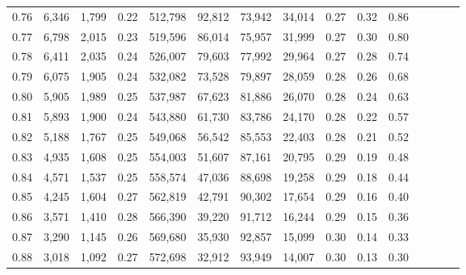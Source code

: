 \begin{tabular}{rrrcrrrrrrrrrrr}
0.76 &   6,346 &  1,799 &                                       0.22 &  512,798 &   92,812 &   73,942 &   34,014 &  0.27 &  0.32 &                         0.86 \\
0.77 &   6,798 &  2,015 &                                       0.23 &  519,596 &   86,014 &   75,957 &   31,999 &  0.27 &  0.30 &                         0.80 \\
0.78 &   6,411 &  2,035 &                                       0.24 &  526,007 &   79,603 &   77,992 &   29,964 &  0.27 &  0.28 &                         0.74 \\
0.79 &   6,075 &  1,905 &                                       0.24 &  532,082 &   73,528 &   79,897 &   28,059 &  0.28 &  0.26 &                         0.68 \\
0.80 &   5,905 &  1,989 &                                       0.25 &  537,987 &   67,623 &   81,886 &   26,070 &  0.28 &  0.24 &                         0.63 \\
0.81 &   5,893 &  1,900 &                                       0.24 &  543,880 &   61,730 &   83,786 &   24,170 &  0.28 &  0.22 &                         0.57 \\
0.82 &   5,188 &  1,767 &                                       0.25 &  549,068 &   56,542 &   85,553 &   22,403 &  0.28 &  0.21 &                         0.52 \\
0.83 &   4,935 &  1,608 &                                       0.25 &  554,003 &   51,607 &   87,161 &   20,795 &  0.29 &  0.19 &                         0.48 \\
0.84 &   4,571 &  1,537 &                                       0.25 &  558,574 &   47,036 &   88,698 &   19,258 &  0.29 &  0.18 &                         0.44 \\
0.85 &   4,245 &  1,604 &                                       0.27 &  562,819 &   42,791 &   90,302 &   17,654 &  0.29 &  0.16 &                         0.40 \\
0.86 &   3,571 &  1,410 &                                       0.28 &  566,390 &   39,220 &   91,712 &   16,244 &  0.29 &  0.15 &                         0.36 \\
0.87 &   3,290 &  1,145 &                                       0.26 &  569,680 &   35,930 &   92,857 &   15,099 &  0.30 &  0.14 &                         0.33 \\
0.88 &   3,018 &  1,092 &                                       0.27 &  572,698 &   32,912 &   93,949 &   14,007 &  0.30 &  0.13 &                         0.30 \\

\end{tabular}
